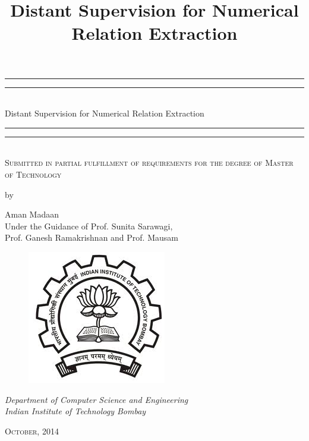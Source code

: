 \documentclass[a4paper,10pt]{article}
\title{Distant Supervision for Numerical Relation Extraction} %
\begin{document}
\begin{titlepage}
    \centering
    \vspace*{\baselineskip}
    \rule{\textwidth}{1.6pt}\vspace*{-\baselineskip}\vspace*{2pt}
    \rule{\textwidth}{0.4pt}\\[\baselineskip]
    {\LARGE \color{blue} Distant Supervision for Numerical Relation Extraction}\\[0.2\baselineskip]
    \rule{ \textwidth}{0.4pt}\vspace*{-\baselineskip}\vspace{3.2pt}
    \rule{\textwidth}{1.6pt}\\[\baselineskip]
    \scshape
    Submitted in partial fulfillment of requirements for the degree of
    Master of Technology \par
    \vspace*{1\baselineskip}
     by \\[\baselineskip]
    {\large  Aman Madaan \vspace*{1\baselineskip} \\ Under the Guidance of Prof. Sunita Sarawagi,\\ Prof. Ganesh Ramakrishnan and Prof. Mausam\par}
       \begin{figure}[h]
 \centering
 \vspace*{13\baselineskip}
 \includegraphics[bb=0 0 229 220,scale=0.35]{./iitb_logo.jpg}
\end{figure}

    {\vspace*{1\baselineskip}  \itshape Department of Computer Science and Engineering \\ Indian Institute of Technology Bombay\par}
    \vfill
 
    {\scshape October, 2014} \\
    {\large }\par
  \end{titlepage}
\newpage
\maketitle
\end{document}
